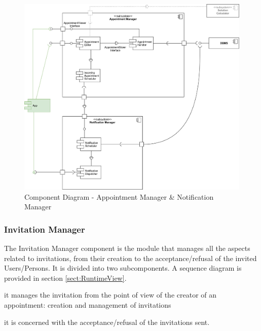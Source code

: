 		\begin{figure}[H]	
			\centerline{\includegraphics[width=0.9\paperwidth]{Images/CD_AppointmentManager}}
			\caption{Component Diagram - Appointment Manager \& Notification Manager}
		\end{figure}
		
	\filbreak
	\subsubsection{Invitation Manager}
		\label{sect:InvitationManager}
		The Invitation Manager component is the module that manages all the aspects related to invitations, from their creation to the acceptance/refusal of the invited Users/Persons. It is divided into two subcomponents. A sequence diagram is provided in section \ref{sect:RuntimeView}.
		\begin{description}[before={\renewcommand{\makelabel}[1]{-- \textit{##1}:}}]
			\item[Invitation Generator] it manages the invitation from the point of view of the creator of an appointment: creation and management of invitations
			\item[Invitation Handler] it is concerned with the acceptance/refusal of the invitations sent.
		\end{description}
		
